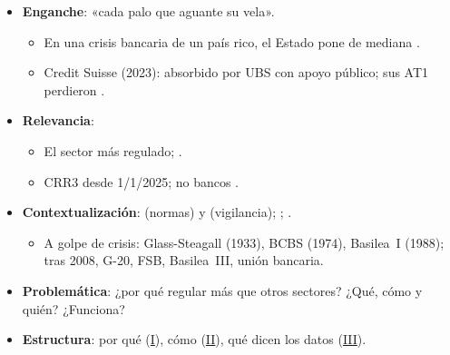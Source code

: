 \documentclass{article}
\begin{document}
\cabecerarepaso
\begin{columnas}

\begin{itemize}
\item \textbf{Enganche}: «cada palo que aguante su vela».
  \begin{itemize}
  \item En una crisis bancaria de un país rico, el Estado pone de mediana .
  \item Credit Suisse (2023): absorbido por UBS con apoyo público; sus AT1 perdieron .
  \end{itemize}
\item \textbf{Relevancia}:
  \begin{itemize}
  \item El sector más regulado; .
  \item CRR3 desde 1/1/2025; no bancos .
  \end{itemize}
\item \textbf{Contextualización}:  (normas) y  (vigilancia); ; .
  \begin{itemize}
  \item A golpe de crisis: Glass-Steagall (1933), BCBS (1974), Basilea~I (1988); tras 2008, G-20, FSB, Basilea~III, unión bancaria.
  \end{itemize}
\item \textbf{Problemática}: ¿por qué regular más que otros sectores? ¿Qué, cómo y quién? ¿Funciona?
\item \textbf{Estructura}: por qué (\hyperref[rep:I]{I}), cómo (\hyperref[rep:II]{II}), qué dicen los datos (\hyperref[rep:III]{III}).
\end{itemize}


\end{columnas}
\end{document}

